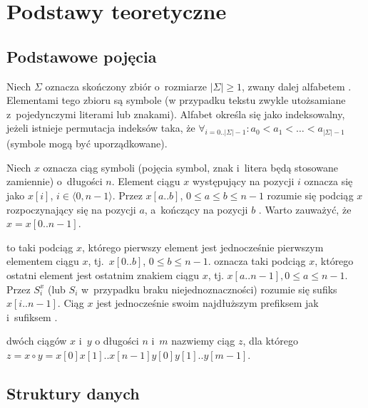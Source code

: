 \chapter{Podstawy teoretyczne}


\section{Podstawowe pojęcia}

Niech $\Sigma$ oznacza skończony zbiór o~rozmiarze $|\Sigma| \geq 1$, zwany
dalej alfabetem \cite{taxonomy}. Elementami tego zbioru są symbole (w przypadku tekstu
zwykle utożsamiane z~pojedynczymi literami lub znakami). Alfabet określa się
jako indeksowalny, jeżeli istnieje permutacja indeksów taka, że 
$\forall_{i=0..|\Sigma|-1}: a_0 < a_1 < \dots < a_{|\Sigma|-1}$
(symbole mogą być uporządkowane).

Niech $x$ oznacza ciąg symboli (pojęcia symbol, znak i~litera będą
stosowane zamiennie) o~długości $n$.
Element ciągu $x$ występujący na pozycji $i$ oznacza się jako $x[i]$, $i \in
\langle0, n-1\rangle$. 
Przez $x[a..b]$, $0 \leq a \leq b \leq n-1$ rozumie się
podciąg $x$ rozpoczynający się na pozycji $a$, a~kończący na pozycji $b$ \cite{gusfield}.
Warto zauważyć, że $x = x[0..n-1]$.

 to taki podciąg $x$, którego pierwszy element
jest jednocześnie pierwszym elementem ciągu $x$, tj.~$x[0..b]$, $0 \leq b \leq
n-1$. 
 oznacza taki podciąg $x$, którego ostatni element jest
ostatnim znakiem ciągu $x$, tj. $x[a..n-1], 0 \leq a \leq n-1$. Przez
$S^{x}_{i}$ (lub $S_i$ w~przypadku braku niejednoznaczności) rozumie się
sufiks $x[i..n-1]$. Ciąg $x$ jest jednocześnie swoim najdłuższym prefiksem jak i~sufiksem \cite{gusfield}.

 dwóch ciągów $x$ i~$y$ o długości $n$ i~$m$ nazwiemy
ciąg $z$, dla którego $z = x \circ y = x[0] x[1] .. x[n-1] y[0] y[1] .. y[m-1]$. 


\section{Struktury danych}
    
